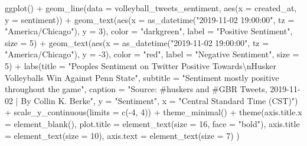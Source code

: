\documentclass[
  letterpaper,
  DIV=11,
  numbers=noendperiod]{scrreprt}
\newenvironment{Shaded}{\begin{snugshade}}{\end{snugshade}}
\newcommand{\AttributeTok}[1]{\textcolor[rgb]{0.40,0.45,0.13}{#1}}
\newcommand{\DecValTok}[1]{\textcolor[rgb]{0.68,0.00,0.00}{#1}}
\newcommand{\FunctionTok}[1]{\textcolor[rgb]{0.28,0.35,0.67}{#1}}
\newcommand{\NormalTok}[1]{\textcolor[rgb]{0.00,0.23,0.31}{#1}}
\newcommand{\SpecialCharTok}[1]{\textcolor[rgb]{0.37,0.37,0.37}{#1}}
\newcommand{\StringTok}[1]{\textcolor[rgb]{0.13,0.47,0.30}{#1}}
\begin{document}
\begin{Shaded}
\begin{Highlighting}[]
\FunctionTok{ggplot}\NormalTok{() }\SpecialCharTok{+}
  \FunctionTok{geom\_line}\NormalTok{(}\AttributeTok{data =}\NormalTok{ volleyball\_tweets\_sentiment, }\FunctionTok{aes}\NormalTok{(}\AttributeTok{x =}\NormalTok{ created\_at, }\AttributeTok{y =}\NormalTok{ sentiment)) }\SpecialCharTok{+}
  \FunctionTok{geom\_text}\NormalTok{(}\FunctionTok{aes}\NormalTok{(}\AttributeTok{x =} \FunctionTok{as\_datetime}\NormalTok{(}\StringTok{"2019{-}11{-}02 19:00:00"}\NormalTok{, }\AttributeTok{tz =} \StringTok{"America/Chicago"}\NormalTok{), }\AttributeTok{y =} \DecValTok{3}\NormalTok{), }\AttributeTok{color =} \StringTok{"darkgreen"}\NormalTok{, }\AttributeTok{label =} \StringTok{"Positive Sentiment"}\NormalTok{, }\AttributeTok{size =} \DecValTok{5}\NormalTok{) }\SpecialCharTok{+}
  \FunctionTok{geom\_text}\NormalTok{(}\FunctionTok{aes}\NormalTok{(}\AttributeTok{x =} \FunctionTok{as\_datetime}\NormalTok{(}\StringTok{"2019{-}11{-}02 19:00:00"}\NormalTok{, }\AttributeTok{tz =} \StringTok{"America/Chicago"}\NormalTok{), }\AttributeTok{y =} \SpecialCharTok{{-}}\DecValTok{3}\NormalTok{), }\AttributeTok{color =} \StringTok{"red"}\NormalTok{, }\AttributeTok{label =} \StringTok{"Negative Sentiment"}\NormalTok{, }\AttributeTok{size =} \DecValTok{5}\NormalTok{) }\SpecialCharTok{+}
  \FunctionTok{labs}\NormalTok{(}\AttributeTok{title =} \StringTok{"People\textquotesingle{}s Sentiment on Twitter Positive Towards}\SpecialCharTok{\textbackslash{}n}\StringTok{Husker Volleyball\textquotesingle{}s Win Against Penn State"}\NormalTok{,}
       \AttributeTok{subtitle =} \StringTok{"Sentiment mostly positive throughout the game"}\NormalTok{,}
       \AttributeTok{caption =} \StringTok{"Source: \#huskers and \#GBR Tweets, 2019{-}11{-}02 | By Collin K. Berke"}\NormalTok{,}
       \AttributeTok{y =} \StringTok{"Sentiment"}\NormalTok{,}
       \AttributeTok{x =} \StringTok{"Central Standard Time (CST)"}\NormalTok{) }\SpecialCharTok{+} 
  \FunctionTok{scale\_y\_continuous}\NormalTok{(}\AttributeTok{limits =} \FunctionTok{c}\NormalTok{(}\SpecialCharTok{{-}}\DecValTok{4}\NormalTok{, }\DecValTok{4}\NormalTok{)) }\SpecialCharTok{+}
  \FunctionTok{theme\_minimal}\NormalTok{() }\SpecialCharTok{+}
  \FunctionTok{theme}\NormalTok{(}\AttributeTok{axis.title.x =} \FunctionTok{element\_blank}\NormalTok{(),}
        \AttributeTok{plot.title =} \FunctionTok{element\_text}\NormalTok{(}\AttributeTok{size =} \DecValTok{16}\NormalTok{, }\AttributeTok{face =} \StringTok{"bold"}\NormalTok{),}
    \AttributeTok{axis.title =} \FunctionTok{element\_text}\NormalTok{(}\AttributeTok{size =} \DecValTok{10}\NormalTok{),}
    \AttributeTok{axis.text =} \FunctionTok{element\_text}\NormalTok{(}\AttributeTok{size =} \DecValTok{7}\NormalTok{)}
\NormalTok{        )}
\end{Highlighting}
\end{Shaded}
\end{document}
